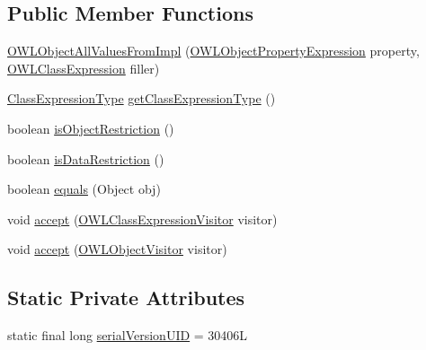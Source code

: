 \subsection*{Public Member Functions}
\begin{DoxyCompactItemize}
\item 
\hyperlink{classuk_1_1ac_1_1manchester_1_1cs_1_1owl_1_1owlapi_1_1_o_w_l_object_all_values_from_impl_ae19527bc19fe0bb17790668ddc9b10d1}{O\-W\-L\-Object\-All\-Values\-From\-Impl} (\hyperlink{interfaceorg_1_1semanticweb_1_1owlapi_1_1model_1_1_o_w_l_object_property_expression}{O\-W\-L\-Object\-Property\-Expression} property, \hyperlink{interfaceorg_1_1semanticweb_1_1owlapi_1_1model_1_1_o_w_l_class_expression}{O\-W\-L\-Class\-Expression} filler)
\item 
\hyperlink{enumorg_1_1semanticweb_1_1owlapi_1_1model_1_1_class_expression_type}{Class\-Expression\-Type} \hyperlink{classuk_1_1ac_1_1manchester_1_1cs_1_1owl_1_1owlapi_1_1_o_w_l_object_all_values_from_impl_a6b0a6fe52562bb202ecca1c6fbdbf65c}{get\-Class\-Expression\-Type} ()
\item 
boolean \hyperlink{classuk_1_1ac_1_1manchester_1_1cs_1_1owl_1_1owlapi_1_1_o_w_l_object_all_values_from_impl_a5c20bef209d4f1ce1e0abb376ba30c48}{is\-Object\-Restriction} ()
\item 
boolean \hyperlink{classuk_1_1ac_1_1manchester_1_1cs_1_1owl_1_1owlapi_1_1_o_w_l_object_all_values_from_impl_af5a4353d067ffc19ea5bf77d6e445b03}{is\-Data\-Restriction} ()
\item 
boolean \hyperlink{classuk_1_1ac_1_1manchester_1_1cs_1_1owl_1_1owlapi_1_1_o_w_l_object_all_values_from_impl_a8d870484e9be0de349bdaa089dfb8ede}{equals} (Object obj)
\item 
void \hyperlink{classuk_1_1ac_1_1manchester_1_1cs_1_1owl_1_1owlapi_1_1_o_w_l_object_all_values_from_impl_ab19b2655bc93fa3dbdac743c469a635f}{accept} (\hyperlink{interfaceorg_1_1semanticweb_1_1owlapi_1_1model_1_1_o_w_l_class_expression_visitor}{O\-W\-L\-Class\-Expression\-Visitor} visitor)
\item 
void \hyperlink{classuk_1_1ac_1_1manchester_1_1cs_1_1owl_1_1owlapi_1_1_o_w_l_object_all_values_from_impl_aaeec17a89ba5a7eae5772486d939c326}{accept} (\hyperlink{interfaceorg_1_1semanticweb_1_1owlapi_1_1model_1_1_o_w_l_object_visitor}{O\-W\-L\-Object\-Visitor} visitor)
\end{DoxyCompactItemize}
\subsection*{Static Private Attributes}
\begin{DoxyCompactItemize}
\item 
static final long \hyperlink{classuk_1_1ac_1_1manchester_1_1cs_1_1owl_1_1owlapi_1_1_o_w_l_object_all_values_from_impl_a57f2995c5b9f43ab3935f78d5b87f11e}{serial\-Version\-U\-I\-D} = 30406\-L
\end{DoxyCompactItemize}

